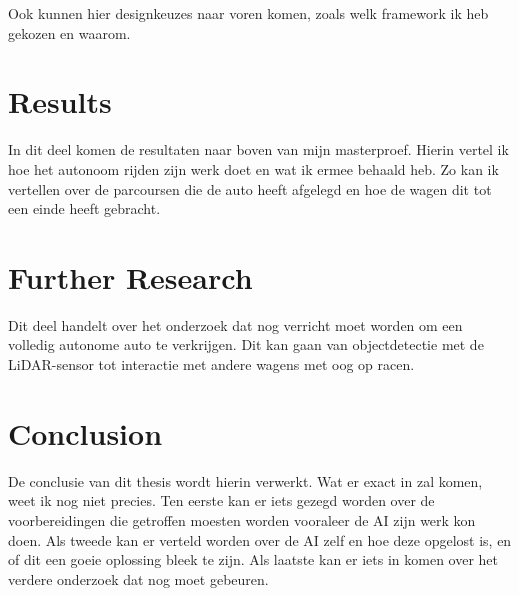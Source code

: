 \documentclass[conference,a4paper]{IEEEtran}
\begin{document}
Ook kunnen hier designkeuzes naar voren komen, zoals welk framework ik heb gekozen en waarom. 

\section{Results}
In dit deel komen de resultaten naar boven van mijn masterproef. Hierin vertel ik hoe het autonoom rijden zijn werk doet en wat ik ermee behaald heb. Zo kan ik vertellen over de parcoursen die de auto heeft afgelegd en hoe de wagen dit tot een einde heeft gebracht. 

\section{Further Research}
Dit deel handelt over het onderzoek dat nog verricht moet worden om een volledig autonome auto te verkrijgen. Dit kan gaan van objectdetectie met de LiDAR-sensor tot interactie met andere wagens met oog op racen.

\section{Conclusion}
De conclusie van dit thesis wordt hierin verwerkt. Wat er exact in zal komen, weet ik nog niet precies. Ten eerste kan er iets gezegd worden over de voorbereidingen die getroffen moesten worden vooraleer de AI zijn werk kon doen. Als tweede kan er verteld worden over de AI zelf en hoe deze opgelost is, en of dit een goeie oplossing bleek te zijn. Als laatste kan er iets in komen over het verdere onderzoek dat nog moet gebeuren. 


%
%
%



\newpage


%




\end{document}

